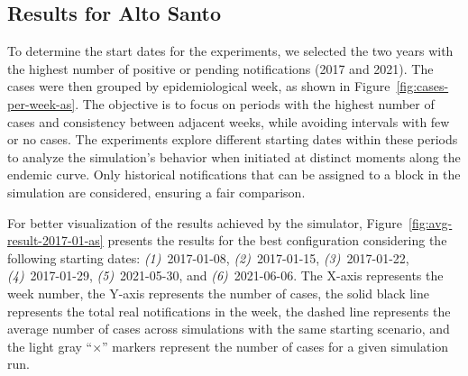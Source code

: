 \subsection{Results for Alto Santo}\label{subsec:results-alto-santo}

To determine the start dates for the experiments, we selected the two years with the highest number of positive or pending notifications (2017 and 2021). The cases were then grouped by epidemiological week, as shown in Figure~\ref{fig:cases-per-week-as}. The objective is to focus on periods with the highest number of cases and consistency between adjacent weeks, while avoiding intervals with few or no cases. The experiments explore different starting dates within these periods to analyze the simulation's behavior when initiated at distinct moments along the endemic curve. Only historical notifications that can be assigned to a block in the simulation are considered, ensuring a fair comparison.

For better visualization of the results achieved by the simulator, Figure~\ref{fig:avg-result-2017-01-as} presents the results for the best configuration considering the following starting dates: \textit{(1)}~2017-01-08, \textit{(2)}~2017-01-15, \textit{(3)}~2017-01-22, \textit{(4)}~2017-01-29, \textit{(5)}~2021-05-30, and \textit{(6)}~2021-06-06. The X-axis represents the week number, the Y-axis represents the number of cases, the solid black line represents the total real notifications in the week, the dashed line represents the average number of cases across simulations with the same starting scenario, and the light gray ``$\times$'' markers represent the number of cases for a given simulation run.

